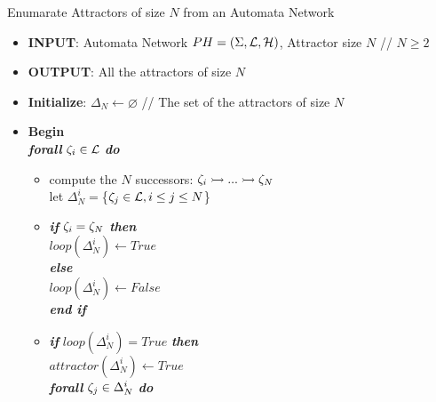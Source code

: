 \begin{algorithm}[!h]
	\caption{Enumarate Attractors of size $N$ from an Automata Network}
	\label{alg:PH-attractor}
	\begin{itemize}
		\item[] \textbf{INPUT}: Automata Network $PH=(\Sigma,\mathcal{L},\mathcal{H})$, Attractor size $N$ // $N \geq 2$
		\item[] \textbf{OUTPUT}: All the attractors of size $N$
		\item[] \textbf{Initialize}: $\Delta_N \longleftarrow \varnothing$ // The set of the attractors of size $N$
		\item[] \textbf{Begin} \\
		
			\hspace{0.2cm}	\textbf{\textit{forall}} $\zeta_i \in \mathcal{L}$ \textbf{\textit{do}} 
				
				\begin{itemize}
					\item[] compute the $N$ successors: $\zeta_i \rightarrowtail ... \rightarrowtail \zeta_N$ \\ let $\Delta_N^i=$\{$\zeta_j \in \mathcal{L}, i \leq j \leq N$\} %
					
					\item[] \textbf{\textit{if}} $\zeta_i = \zeta_N$ \textbf{\textit{then}} \\
						\hspace{0.7cm}  $loop(\Delta_N^i) \longleftarrow True$ \\
					 \textbf{\textit{else}} \\
					 	\hspace{0.7cm}  $loop(\Delta_N^i) \longleftarrow False$ \\
					 \textbf{\textit{end if}} 
					 
					\item[] \textbf{\textit{if}} $loop(\Delta_N^i) = True$ \textbf{\textit{then}} \\
					
							\hspace{0.7cm} $attractor(\Delta_N^i) \longleftarrow True$	\\
							
							\hspace{0.7cm} \textbf{\textit{forall}} $\zeta_j \in \Delta_N^i$ \textbf{\textit{do}} \\
							

\end{itemize}
\end{itemize}
\end{algorithm}
